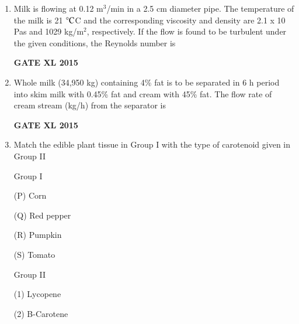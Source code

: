 \documentclass[journal,12pt,onecolumn]{IEEEtran}
\begin{document}
\begin{enumerate}
\begin{minipage}{0.5\textwidth}
\begin{flushleft}
(1) Removal of cooked flavor from milk

(2) Soybean milk coagulation

(3) For rennet puddings

(4) Lactose removal
	\end{flushleft}

	\end{minipage}

    \begin{enumerate}
            \item P-3,Q-2,R-1,S-4
            \item P-3,Q-1,R-4,S-2
            \item P-1,Q-3,R-4,S-2
            \item P-4,Q-3,R-2,S-1
    \end{enumerate}
\item Milk is flowing at 0.12 m$^3$/min in a 2.5 cm diameter pipe. The temperature of the milk is 21 $\celsius$C and the corresponding viscosity and density are 2.1 x 10 Pas and 1029 kg/m$^2$, respectively. If the flow is found to be turbulent under the given conditions, the Reynolds number is
\begin{flushright}\textbf{GATE XL 2015}\end{flushright}
\item Whole milk (34,950 kg) containing 4\% fat is to be separated in 6 h period into skim milk with 0.45\% fat and cream with 45\% fat. The flow rate of cream stream (kg/h) from the separator is
\begin{flushright}\textbf{GATE XL 2015}\end{flushright}
\item Match the edible plant tissue in Group I with the type of carotenoid given in Group II

	\begin{minipage}{0.5\textwidth}\begin{flushleft}
Group I

(P) Corn

(Q) Red pepper

(R) Pumpkin

(S) Tomato 
	\end{flushleft}
	\end{minipage}
	\begin{minipage}{0.5\textwidth}\begin{flushleft}
Group II

(1) Lycopene

(2) B-Carotene


\end{flushleft}
\end{minipage}
\end{enumerate}
\end{document}

